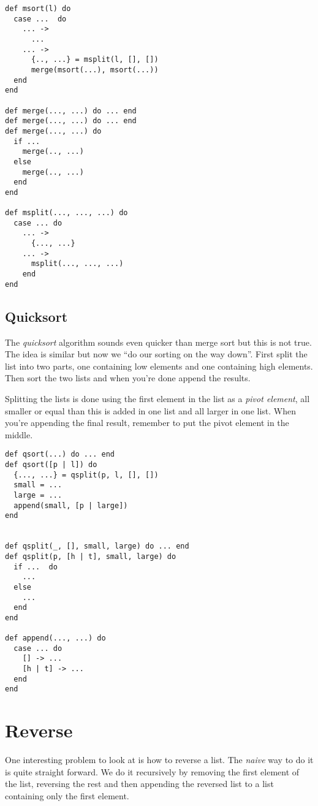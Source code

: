 \documentclass[a4paper,11pt]{article}
\begin{document}
\pagebreak

\begin{verbatim}
def msort(l) do
  case ...  do
    ... -> 
      ...
    ... ->
      {.., ...} = msplit(l, [], [])
      merge(msort(...), msort(...))
  end
end

def merge(..., ...) do ... end
def merge(..., ...) do ... end
def merge(..., ...) do
  if ...
    merge(.., ...)
  else 
    merge(.., ...)
  end
end

def msplit(..., ..., ...) do
  case ... do
    ... -> 
      {..., ...}
    ... ->
      msplit(..., ..., ...)
    end
end
\end{verbatim}


\subsection{Quicksort}

The {\em quicksort} algorithm sounds even quicker than merge sort but
this is not true. The idea is similar but now we ``do our sorting on
the way down''. First split the list into two parts, one containing low
elements and one containing high elements. Then sort the two lists and
when you're done append the results. 

Splitting the lists is done using the first element in the list as a
{\em pivot element}, all smaller or equal than this is added in one
list and all larger in one list. When you're appending the final
result, remember to put the pivot element in the middle.

\begin{verbatim}
def qsort(...) do ... end
def qsort([p | l]) do 
  {..., ...} = qsplit(p, l, [], [])
  small = ...
  large = ...
  append(small, [p | large])
end


def qsplit(_, [], small, large) do ... end
def qsplit(p, [h | t], small, large) do
  if ...  do
    ...
  else
    ...
  end
end

def append(..., ...) do
  case ... do
    [] -> ...
    [h | t] -> ...
  end
end
\end{verbatim}



\section{Reverse}

One interesting problem to look at is how to reverse a list. The {\em
  naive} way to do it is quite straight forward. We do it recursively
by removing the first element of the list, reversing the rest and then
appending the reversed list to a list containing only the first element.
\end{document}
